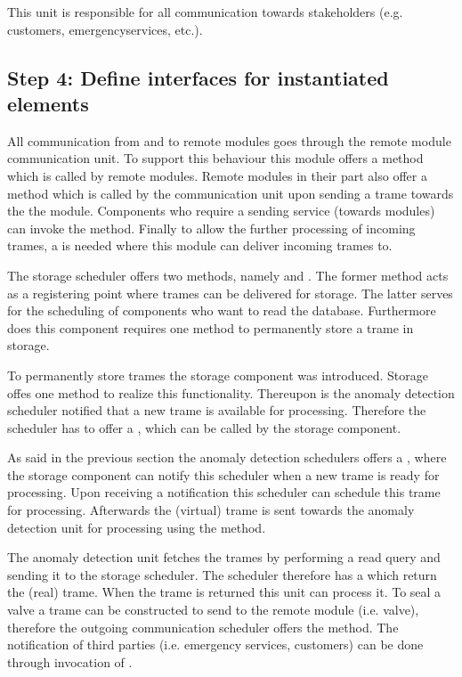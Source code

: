 \npar This unit is responsible for all communication towards stakeholders (e.g.
customers, emergencyservices, etc.). 

\subsection{Step 4: Define interfaces for instantiated elements}
\label{add:it1/interfaces}


\npar All communication from and to remote modules goes through the remote
module communication unit. To support this behaviour this module offers a
 method which is called by remote modules. Remote
modules in their part also offer a  method which is called
by the communication unit upon sending a trame towards the the module. Components
who require a sending service (towards modules) can invoke the
 method. Finally to allow the further processing of
incoming trames, a  is needed where this
module can deliver incoming trames to.

\npar The storage scheduler offers two methods, namely
 and . The
former method acts as a registering point where trames can be delivered for
storage. The latter serves for the scheduling of components who want
to read the database. Furthermore does this component requires one method
 to permanently store a trame in storage.

\npar To permanently store trames the storage component was introduced. Storage
offes one method  to realize this functionality.
Thereupon is the anomaly detection scheduler notified that a new trame is
available for processing. Therefore the scheduler has to offer a
, which can be called by the storage component.

\npar As said in the previous section the anomaly detection schedulers offers a
, where the storage component can notify this scheduler
when a new trame is ready for processing. Upon receiving a notification this
scheduler can schedule this trame for processing. Afterwards the (virtual)
trame is sent towards the anomaly detection unit for processing using the
 method.

\npar The anomaly detection unit fetches the trames by performing a read query
and sending it to the storage scheduler. The scheduler therefore has a
 which return the (real) trame. When the trame is
returned this unit can process it. To seal a valve a trame can be constructed to
send to the remote module (i.e. valve), therefore the outgoing
communication scheduler offers the  method. The
notification of third parties (i.e. emergency services, customers) can be done
through invocation of .

